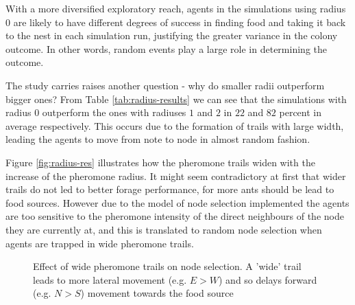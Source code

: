 With a more diversified exploratory reach, agents in the simulations using radius $0$ are likely to have different degrees of success in finding food and taking it back to the nest in each simulation run, justifying the greater variance in the colony outcome. In other words, random events play a large role in determining the outcome.

The study carries raises another question - why do smaller radii outperform bigger ones? From Table \ref{tab:radius-results} we can see that the simulations with radius $0$ outperform the ones with radiuses $1$ and $2$ in $22$ and $82$ percent in average respectively. This occurs due to the formation of trails with large width, leading the agents to move from note to node in almost random fashion. 

Figure \ref{fig:radius-res} illustrates how the pheromone trails widen with the increase of the pheromone radius. It might seem contradictory at first that wider trails do not led to better forage performance, for more ants should be lead to food sources. However due to the model of node selection implemented the agents are too sensitive to the pheromone intensity of the direct neighbours of the node they are currently at, and this is translated to random node selection when agents are trapped in wide pheromone trails. 

\begin{figure}[H]
\myfloatalign
{} \quad
{}

\caption{Effect of wide pheromone trails on node selection. A 'wide' trail leads to more lateral movement (e.g. $E > W$) and so delays forward (e.g. $N > S$) movement towards the food source}\label{fig:radius-saturation}
\end{figure}

